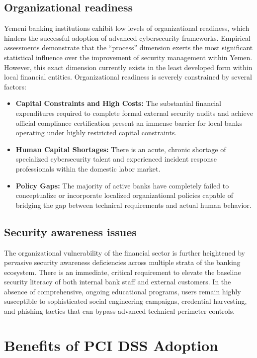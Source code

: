 \documentclass[12pt,a4paper,oneside]{report}
\begin{document}
	\subsection{Organizational readiness}
	Yemeni banking institutions exhibit low levels of organizational readiness, which hinders the successful adoption of advanced cybersecurity frameworks. Empirical assessments demonstrate that the ``process'' dimension exerts the most significant statistical influence over the improvement of security management within Yemen. However, this exact dimension currently exists in the least developed form within local financial entities. Organizational readiness is severely constrained by several factors:
	\begin{itemize}
		\item \textbf{Capital Constraints and High Costs:} The substantial financial expenditures required to complete formal external security audits and achieve official compliance certification present an immense barrier for local banks operating under highly restricted capital constraints.
		\item \textbf{Human Capital Shortages:} There is an acute, chronic shortage of specialized cybersecurity talent and experienced incident response professionals within the domestic labor market.
		\item \textbf{Policy Gaps:} The majority of active banks have completely failed to conceptualize or incorporate localized organizational policies capable of bridging the gap between technical requirements and actual human behavior.
	\end{itemize}
	
	\subsection{Security awareness issues}
	The organizational vulnerability of the financial sector is further heightened by pervasive security awareness deficiencies across multiple strata of the banking ecosystem. There is an immediate, critical requirement to elevate the baseline security literacy of both internal bank staff and external customers. In the absence of comprehensive, ongoing educational programs, users remain highly susceptible to sophisticated social engineering campaigns, credential harvesting, and phishing tactics that can bypass advanced technical perimeter controls.
	
	\section{Benefits of PCI DSS Adoption}
	
\end{document}
